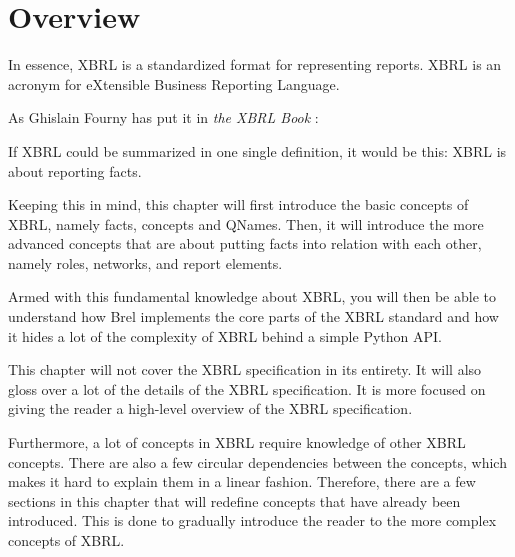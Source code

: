 \section{Overview}

In essence, XBRL is a standardized format for representing reports.
XBRL is an acronym for eXtensible Business Reporting Language.

As Ghislain Fourny has put it in \textit{the XBRL Book} \cite{fourny2023xbrl}:
\begin{displayquote}
    If XBRL could be summarized in one single definition, it would be this:
    XBRL is about reporting facts.
\end{displayquote}

Keeping this in mind, this chapter will first introduce the basic concepts of XBRL, namely facts, concepts and QNames.
Then, it will introduce the more advanced concepts that are about putting facts into relation with each other, namely roles, networks, and report elements.

Armed with this fundamental knowledge about XBRL, 
you will then be able to understand how Brel implements the core parts of the XBRL standard and how it hides a lot of the complexity of XBRL behind a simple Python API.

This chapter will not cover the XBRL specification in its entirety.
It will also gloss over a lot of the details of the XBRL specification.
It is more focused on giving the reader a high-level overview of the XBRL specification.

Furthermore, a lot of concepts in XBRL require knowledge of other XBRL concepts.
There are also a few circular dependencies between the concepts, which makes it hard to explain them in a linear fashion.
Therefore, there are a few sections in this chapter that will redefine concepts that have already been introduced.
This is done to gradually introduce the reader to the more complex concepts of XBRL.
